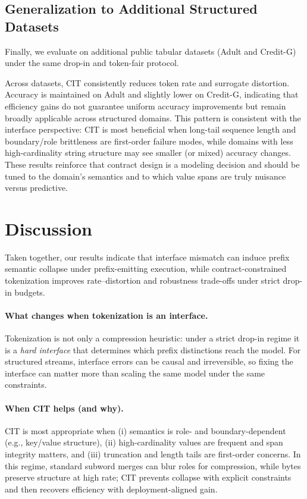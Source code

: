 

\subsection{Generalization to Additional Structured Datasets}
\label{sec:exp_generalization}

Finally, we evaluate on additional public tabular datasets (Adult and Credit-G) under the same drop-in and token-fair protocol.

Across datasets, CIT consistently reduces token rate and surrogate distortion.
Accuracy is maintained on Adult and slightly lower on Credit-G, indicating that efficiency gains do not guarantee uniform accuracy improvements but remain broadly applicable across structured domains.
This pattern is consistent with the interface perspective: CIT is most beneficial when long-tail sequence length and boundary/role brittleness are first-order failure modes, while domains with less high-cardinality string structure may see smaller (or mixed) accuracy changes.
These results reinforce that contract design is a modeling decision and should be tuned to the domain's semantics and to which value spans are truly nuisance versus predictive.



\section{Discussion}
\label{sec:discussion}

Taken together, our results indicate that interface mismatch can induce prefix semantic collapse under prefix-emitting execution, while contract-constrained tokenization improves rate--distortion and robustness trade-offs under strict drop-in budgets.

\paragraph{What changes when tokenization is an interface.}
Tokenization is not only a compression heuristic: under a strict drop-in regime it is a \emph{hard interface} that determines which prefix distinctions reach the model.
For structured streams, interface errors can be causal and irreversible, so fixing the interface can matter more than scaling the same model under the same constraints.

\paragraph{When CIT helps (and why).}
CIT is most appropriate when (i) semantics is role- and boundary-dependent (e.g., key/value structure), (ii) high-cardinality values are frequent and span integrity matters, and (iii) truncation and length tails are first-order concerns.
In this regime, standard subword merges can blur roles for compression, while bytes preserve structure at high rate; CIT prevents collapse with explicit constraints and then recovers efficiency with deployment-aligned gain.

